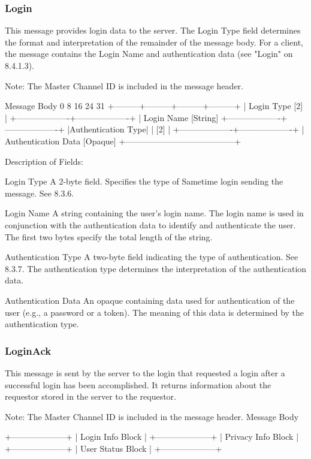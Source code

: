\documentclass[titlepage,oneside]{book}
\begin{document}
\subsubsection{Login}

This message provides login data to the server. The Login Type field
determines the format and interpretation of the remainder of the
message body. For a client, the message contains the Login Name and
authentication data (see "Login" on 8.4.1.3).

Note: The Master Channel ID is included in the message header.

Message Body
0         8         16        24      31
+---------+---------+---------+---------+
| Login Type [2]    |
+-------------------+-------------------+
| Login Name [String]
+-------------------+-------------------+
|Authentication Type|
|        [2]        |
+-------------------+-------------------+
| Authentication Data [Opaque]
+---------------------------------------+


Description of Fields:

Login Type
  A 2-byte field. Specifies the type of Sametime login sending the
  message. See 8.3.6.

Login Name
  A string containing the user's login name. The login name is used in
  conjunction with the authentication data to identify and
  authenticate the user. The first two bytes specify the total length
  of the string.

Authentication Type
  A two-byte field indicating the type of authentication. See 
  8.3.7. The authentication type determines the 
  interpretation of the authentication data.

Authentication Data
  An opaque containing data used for authentication of the user (e.g.,
  a password or a token). The meaning of this data is determined by
  the authentication type.

\subsubsection{LoginAck}

This message is sent by the server to the login that requested a
login after a successful login has been accomplished. It returns
information about the requestor stored in the server to the requestor.

Note: The Master Channel ID is included in the message header.
Message Body

+--------------------+
|  Login Info Block  |
+--------------------+
| Privacy Info Block |
+--------------------+
|  User Status Block |
+--------------------+
\end{document}

